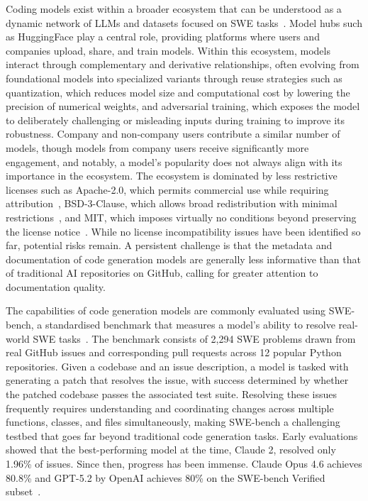 \documentclass[
english,                 %
bibtex,                  %
includeExtraAbstracts, %
]{kththesis}
\numberwithin{listing}{chapter}
\begin{document}
Coding models exist within a broader ecosystem that can be understood as a dynamic network of \glspl{LLM} and datasets focused on \gls{SWE} tasks~\cite{yang_ecosystem_2026}. Model hubs such as HuggingFace play a central role, providing platforms where users and companies upload, share, and train models. Within this ecosystem, models interact through complementary and derivative relationships, often evolving from foundational models into specialized variants through reuse strategies such as quantization, which reduces model size and computational cost by lowering the precision of numerical weights, and adversarial training, which exposes the model to deliberately challenging or misleading inputs during training to improve its robustness. Company and non-company users contribute a similar number of models, though models from company users receive significantly more engagement, and notably, a model's popularity does not always align with its importance in the ecosystem. The ecosystem is dominated by less restrictive licenses such as Apache-2.0, which permits commercial use while requiring attribution~\cite{the_apache_software_foundation_apache_2026}, \gls{BSD}-3-Clause, which allows broad redistribution with minimal restrictions~\cite{opensourceorg_3-clause_2026}, and \gls{MIT}, which imposes virtually no conditions beyond preserving the license notice~\cite{opensourceorg_mit_2026}. While no license incompatibility issues have been identified so far, potential risks remain. A persistent challenge is that the metadata and documentation of code generation models are generally less informative than that of traditional \gls{AI} repositories on GitHub, calling for greater attention to documentation quality.

The capabilities of code generation models are commonly evaluated using \gls{SWE}-bench, a standardised benchmark that measures a model's ability to resolve real-world \gls{SWE} tasks~\cite{jimenez_swe-bench_2024}. The benchmark consists of 2,294 \gls{SWE} problems drawn from real GitHub issues and corresponding pull requests across 12 popular Python repositories. Given a codebase and an issue description, a model is tasked with generating a patch that resolves the issue, with success determined by whether the patched codebase passes the associated test suite. Resolving these issues frequently requires understanding and coordinating changes across multiple functions, classes, and files simultaneously, making \gls{SWE}-bench a challenging testbed that goes far beyond traditional code generation tasks. Early evaluations showed that the best-performing model at the time, Claude 2, resolved only 1.96\% of issues. Since then, progress has been immense. Claude Opus 4.6 achieves 80.8\% and \gls{GPT}-5.2 by Open\Gls{AI} achieves 80\% on the \gls{SWE}-bench Verified subset~\cite{anthropic_pbc_system_2026}.
\end{document}

